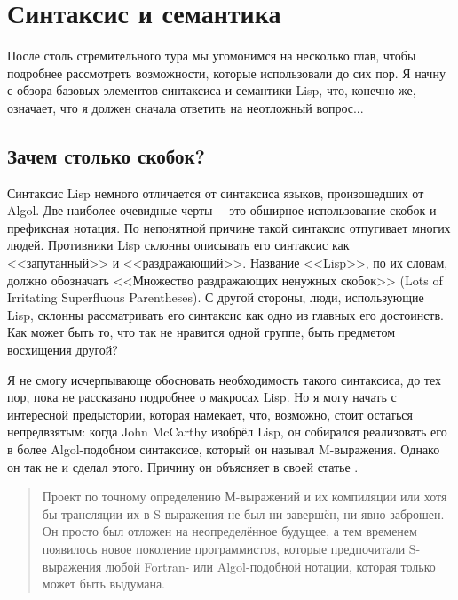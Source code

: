 \chapter{Синтаксис и семантика}
\label{ch:04}

\thispagestyle{empty}

После столь стремительного тура мы угомонимся на несколько глав, чтобы подробнее
рассмотреть возможности, которые использовали до сих пор. Я начну с обзора базовых
элементов синтаксиса и семантики Lisp, что, конечно же, означает, что я должен сначала
ответить на неотложный вопрос...

\section{Зачем столько скобок?}

Синтаксис Lisp немного отличается от синтаксиса языков, произошедших от Algol. Две
наиболее очевидные черты~-- это обширное использование скобок и префиксная нотация. По
непонятной причине такой синтаксис отпугивает многих людей. Противники Lisp склонны
описывать его синтаксис как <<запутанный>> и <<раздражающий>>. Название <<Lisp>>, по их словам,
должно обозначать <<Множество раздражающих ненужных скобок>> (Lots of Irritating Superfluous
Parentheses). С другой стороны, люди, исполь\-зую\-щие Lisp, склонны рассматривать его
синтаксис как одно из главных его достоинств. Как может быть то, что так не нравится одной
группе, быть предметом восхищения другой?

Я не смогу исчерпывающе обосновать необходимость такого синтаксиса, до тех пор, пока не
рассказано подробнее о макросах Lisp. Но я могу начать с интересной предыстории, которая
намекает, что, возможно, стоит остаться непредвзятым: когда John McCarthy изобрёл Lisp, он
собирался реализовать его в более Algol-подобном синтаксисе, который он называл
M-выражения. Однако он так не и сделал этого. Причину он объясняет в своей статье
\hspace{-0.25em}.

\begin{quote}
  Проект по точному определению М-выражений и их компиляции или хотя бы трансляции их в
  S-выражения не был ни завершён, ни явно заброшен. Он просто был отложен на
  неопределённое будущее, а тем временем появилось новое поколение программистов, которые
  предпочитали S-выражения любой Fortran- или Algol-подобной нотации, которая только может
  быть выдумана.
\end{quote}

